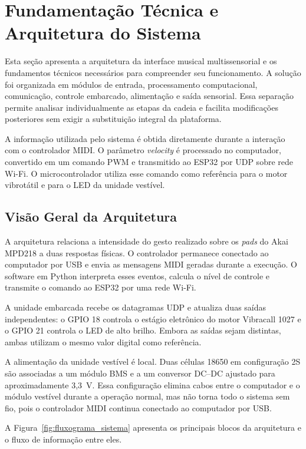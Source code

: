 \chapter{Fundamentação Técnica e Arquitetura do Sistema}

Esta seção apresenta a arquitetura da interface musical multissensorial e os fundamentos técnicos necessários para compreender seu funcionamento. A solução foi organizada em módulos de entrada, processamento computacional, comunicação, controle embarcado, alimentação e saída sensorial. Essa separação permite analisar individualmente as etapas da cadeia e facilita modificações posteriores sem exigir a substituição integral da plataforma.

A informação utilizada pelo sistema é obtida diretamente durante a interação com o controlador MIDI. O parâmetro \textit{velocity} é processado no computador, convertido em um comando PWM e transmitido ao ESP32 por UDP sobre rede Wi-Fi. O microcontrolador utiliza esse comando como referência para o motor vibrotátil e para o LED da unidade vestível.

\section{Visão Geral da Arquitetura}
\label{sec:visao_geral_arquitetura}

A arquitetura relaciona a intensidade do gesto realizado sobre os \textit{pads} do Akai MPD218 a duas respostas físicas. O controlador permanece conectado ao computador por USB e envia as mensagens MIDI geradas durante a execução. O software em Python interpreta esses eventos, calcula o nível de controle e transmite o comando ao ESP32 por uma rede Wi-Fi.

A unidade embarcada recebe os datagramas UDP e atualiza duas saídas independentes: o GPIO 18 controla o estágio eletrônico do motor Vibracall 1027 e o GPIO 21 controla o LED de alto brilho. Embora as saídas sejam distintas, ambas utilizam o mesmo valor digital como referência.

A alimentação da unidade vestível é local. Duas células 18650 em configuração 2S são associadas a um módulo BMS e a um conversor DC--DC ajustado para aproximadamente 3,3~V. Essa configuração elimina cabos entre o computador e o módulo vestível durante a operação normal, mas não torna todo o sistema sem fio, pois o controlador MIDI continua conectado ao computador por USB.

A Figura~\ref{fig:fluxograma_sistema} apresenta os principais blocos da arquitetura e o fluxo de informação entre eles.


